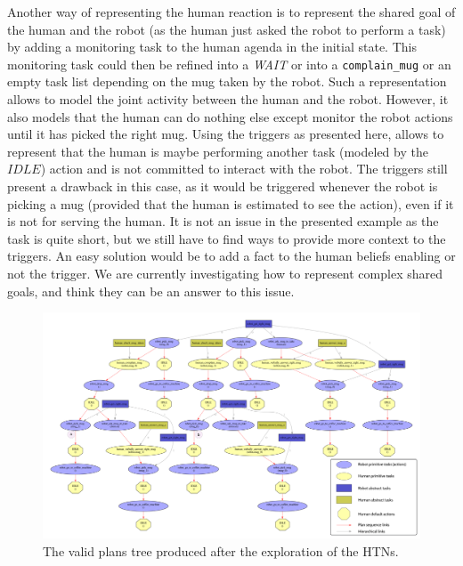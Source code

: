 \documentclass[a4paper,11pt,twoside]{StyleThese}
\begin{document}
Another way of representing the human reaction is to represent the shared goal of the human and the robot (as the human just asked the robot to perform a task) by adding a monitoring task to the human agenda in the initial state. This monitoring task could then be refined into a \textit{WAIT} or into a \verb'complain_mug' or an empty task list depending on the mug taken by the robot. Such a representation allows to model the joint activity between the human and the robot. However, it also models that the human can do nothing else except monitor the robot actions until it has picked the right mug. Using the triggers as presented here, allows to represent that the human is maybe performing another task (modeled by the $IDLE$) action and is not committed to interact with the robot. The triggers still present a drawback in this case, as it would be triggered whenever the robot is picking a mug (provided that the human is estimated to see the action), even if it is not for serving the human. It is not an issue in the presented example as the task is quite short, but we still have to find ways to provide more context to the triggers. An easy solution would be to add a fact to the human beliefs enabling or not the trigger. We are currently investigating how to represent complex shared goals, and think they can be an answer to this issue. 



\begin{figure}[hbtp]
\centering
\includegraphics[height=\textwidth,angle=90,origin=c]{figures/chapter4/mug_selection_search_space.png}
\caption{The valid plans tree produced after the exploration of the HTNs.}
\label{fig:chap4mugsss}
\end{figure}
\end{document}
